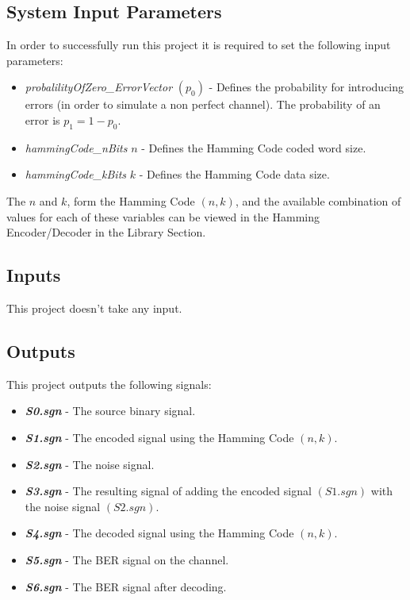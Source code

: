 \begin{refsection}
\subsection*{System Input Parameters}

In order to successfully run this project it is required to set the following input parameters:

\begin{itemize}
	\item \textit{probalilityOfZero\_ErrorVector} $(p_{0})$ - Defines the probability for introducing errors (in order to simulate a non perfect channel). The probability of an error is $p_{1} = 1 - p_{0}$.
	\item \textit{hammingCode\_nBits} $n$ - Defines the Hamming Code coded word size.
	\item \textit{hammingCode\_kBits} $k$ - Defines the Hamming Code data size.
\end{itemize}

The $n$ and $k$, form the Hamming Code $(n, k)$, and the available combination of values for each of these variables can be viewed in the Hamming Encoder/Decoder in the Library Section.

\subsection*{Inputs}

This project doesn't take any input.

\subsection*{Outputs}

This project outputs the following signals:

\begin{itemize}
	\item \textbf{\textit{S0.sgn}} - The source binary signal.
	\item \textbf{\textit{S1.sgn}} - The encoded signal using the Hamming Code $(n, k)$.
	\item \textbf{\textit{S2.sgn}} - The noise signal.
	\item \textbf{\textit{S3.sgn}} - The resulting signal of adding the encoded signal $(S1.sgn)$ with the noise signal $(S2.sgn)$.
	\item \textbf{\textit{S4.sgn}} - The decoded signal using the Hamming Code $(n, k)$.
	\item \textbf{\textit{S5.sgn}} - The BER signal on the channel.
	\item \textbf{\textit{S6.sgn}} - The BER signal after decoding.
\end{itemize}


\end{refsection}
